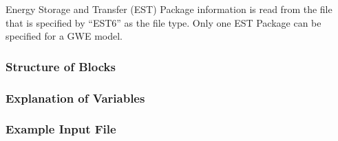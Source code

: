 Energy Storage and Transfer (EST) Package information is read from the file that is specified by ``EST6'' as the file type.  Only one EST Package can be specified for a GWE model. 

\vspace{5mm}
\subsubsection{Structure of Blocks}




\vspace{5mm}
\subsubsection{Explanation of Variables}
\begin{description}

\end{description}

\vspace{5mm}
\subsubsection{Example Input File}


